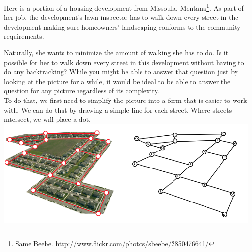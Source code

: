 \begin{example}
Here is a portion of a housing development from Missoula, Montana\footnote{Same Beebe. http://www.flickr.com/photos/sbeebe/2850476641/}.  As part of her job, the development's lawn inspector has to walk down every street in the development making sure homeowners' landscaping conforms to the community requirements.\\
\begin{center}
\end{center}

Naturally, she wants to minimize the amount of walking she has to do.  Is it possible for her to walk down every street in this development without having to do any backtracking?  While you might be able to answer that question just by looking at the picture for a while, it would be ideal to be able to answer the question for any picture regardless of its complexity.\\

To do that, we first need to simplify the picture into a form that is easier to work with.  We can do that by drawing a simple line for each street.  Where streets intersect, we will place a dot. \\
 
 \includegraphics{graph-theory-graphics/GraphPictureDot.png}
\end{example}

